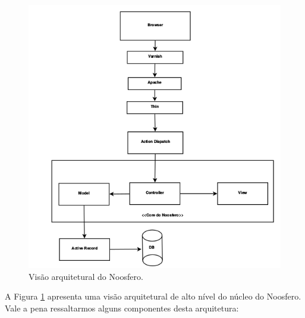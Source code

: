 \begin{figure}[htpb]
    \begin{center}
      \includegraphics[width=.37\textwidth]{images/noosfero-architecture.png}
    \end{center}
    \caption{Visão arquitetural do Noosfero.}
    \label{noosfero-arch}
\end{figure}

A Figura \ref{noosfero-arch} apresenta uma visão arquitetural de alto nível
do núcleo do Noosfero. Vale a pena ressaltarmos alguns componentes desta arquitetura:

